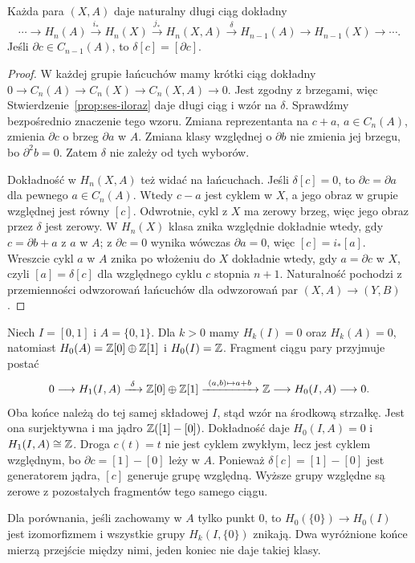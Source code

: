 \begin{twierdzenie}
\label{thm:les-pary}
Każda para $(X,A)$ daje naturalny
długi ciąg dokładny
\begin{equation}\label{eq:les-pary}
 \cdots\to H_n(A)\xrightarrow{i_*}H_n(X)
 \xrightarrow{j_*}H_n(X,A)
 \xrightarrow{\delta}H_{n-1}(A)
 \to H_{n-1}(X)\to\cdots.
\end{equation}
Jeśli $\partial c\in C_{n-1}(A)$,
to $\delta[c]=[\partial c]$.
\end{twierdzenie}
\begin{proof}
W każdej grupie łańcuchów mamy
krótki ciąg dokładny
$0\to C_n(A)\to C_n(X)\to C_n(X,A)\to0$.
Jest zgodny z brzegami, więc
Stwierdzenie~\ref{prop:ses-iloraz}
daje długi ciąg i wzór na $\delta$.
Sprawdźmy bezpośrednio znaczenie tego wzoru. Zmiana reprezentanta
na $c+a$, $a\in C_n(A)$, zmienia $\partial c$ o brzeg $\partial a$
w $A$. Zmiana klasy względnej o $\partial b$ nie zmienia jej brzegu,
bo $\partial^2b=0$. Zatem $\delta$ nie zależy od tych wyborów.

Dokładność w $H_n(X,A)$ też widać na łańcuchach. Jeśli
$\delta[c]=0$, to $\partial c=\partial a$ dla pewnego
$a\in C_n(A)$. Wtedy $c-a$ jest cyklem w $X$, a jego obraz
w grupie względnej jest równy $[c]$.
Odwrotnie, cykl z $X$ ma zerowy brzeg, więc jego obraz przez
$\delta$ jest zerowy. W $H_n(X)$ klasa znika względnie
dokładnie wtedy, gdy $c=\partial b+a$ z $a$ w $A$;
z $\partial c=0$ wynika wówczas $\partial a=0$, więc
$[c]=i_*[a]$. Wreszcie cykl $a$ w $A$ znika po włożeniu do $X$
dokładnie wtedy, gdy $a=\partial c$ w $X$, czyli
$[a]=\delta[c]$ dla względnego cyklu $c$ stopnia $n+1$.
Naturalność pochodzi z przemienności
odwzorowań łańcuchów dla odwzorowań
par $(X,A)\to(Y,B)$.
\end{proof}

\begin{przyklad}
\label{prz:para-odcinek-konce}
Niech $I=[0,1]$ i $A=\{0,1\}$. Dla $k>0$ mamy $H_k(I)=0$
oraz $H_k(A)=0$, natomiast $H_0(A)=\mathbb{Z}[0]\oplus\mathbb{Z}[1]$
i $H_0(I)=\mathbb{Z}$. Fragment ciągu pary przyjmuje postać
\[
 0\longrightarrow H_1(I,A)\xrightarrow{\ \delta\ }
 \mathbb{Z}[0]\oplus\mathbb{Z}[1]\xrightarrow{\ (a,b)\mapsto a+b\ }
 \mathbb{Z}\longrightarrow H_0(I,A)\longrightarrow0.
\]
Oba końce należą do tej samej składowej $I$, stąd wzór
na środkową strzałkę. Jest ona surjektywna i ma jądro
$\mathbb{Z}([1]-[0])$. Dokładność daje $H_0(I,A)=0$ i
$H_1(I,A)\cong\mathbb{Z}$. Droga $c(t)=t$ nie jest cyklem zwykłym,
lecz jest cyklem względnym, bo $\partial c=[1]-[0]$ leży w $A$.
Ponieważ $\delta[c]=[1]-[0]$ jest generatorem jądra,
$[c]$ generuje grupę względną. Wyższe grupy względne są zerowe
z pozostałych fragmentów tego samego ciągu.

Dla porównania, jeśli zachowamy w $A$ tylko punkt $0$,
to $H_0(\{0\})\to H_0(I)$ jest izomorfizmem i wszystkie
grupy $H_k(I,\{0\})$ znikają. Dwa wyróżnione końce mierzą
przejście między nimi, jeden koniec nie daje takiej klasy.
\end{przyklad}

